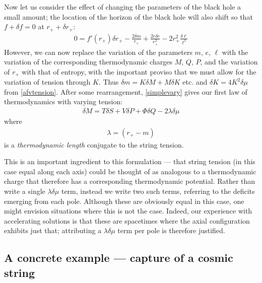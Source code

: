 \documentclass[
twoside,
openright,
frontopenright,
]{dmathesis}
\begin{document}
Now let us consider the effect of changing the parameters of the black hole
a small amount; the location of the horizon of the black hole will also shift
so that $f+\delta f= 0$ at $r_++\delta r_+ $:
\begin{align}
0= f'(r_+) \delta r_+ - \frac{2\delta m}{r_+} 
+ \frac{2e\delta e}{r_+^2}  - 2r_+^2 \frac{\delta \ell}{\ell^3}
\label{simplevary}
\end{align}
However, we can now replace the variation of the parameters $m$, $e$, $\ell$
with the variation of the corresponding thermodynamic charges $M$, $Q$, $P$, and
the variation of $r_+$ with that of entropy, with the important proviso that we
must allow for the variation of tension through $K$. Thus
$\delta m = K \delta M + M \delta K$ etc. and $\delta K = 4K^2\delta \mu$ from
\cref{afvtension}.  After some rearrangement, \cref{simplevary} gives our first
law of thermodynamics with varying tension:
\begin{align}
\delta M = T \delta S + V \delta P + \Phi \delta Q
-2 \lambda \delta\mu
\label{firstlawwithK}
\end{align}
where
\begin{align} 
\lambda = \left ( r_+ - m\right)
\label{TDlengthnoacc}
\end{align}
is a \emph{thermodynamic length} conjugate to the string tension.

This is an important ingredient to this formulation --- that string tension (in
this case equal along each axis) could be thought of as analogous to a
thermodynamic charge that therefore has a corresponding thermodynamic potential.
Rather than write a single $\lambda\delta\mu$ term, instead we write two such
terms, referring to the deficits emerging from each pole. Although these are
obviously equal in this case, one might envision situations where this is not
the case. Indeed, our experience with accelerating solutions is that these are
spacetimes where the axial configuration exhibits just that; attributing a
$\lambda \delta \mu$ term per pole is therefore justified.

\subsection{A concrete example --- capture of a cosmic string}
\end{document}
